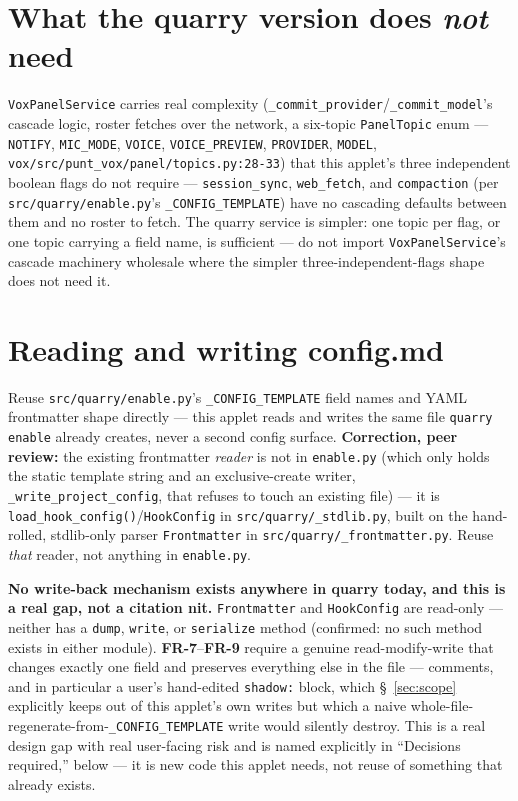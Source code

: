 \documentclass[a4paper,11pt]{report}
\newcommand{\fr}[1]{\textbf{FR-#1}}
\begin{document}
\section{What the quarry version does \emph{not} need}

\texttt{VoxPanelService} carries real complexity
(\texttt{\_commit\_provider}/\texttt{\_commit\_model}'s cascade logic,
roster fetches over the network, a six-topic
\texttt{PanelTopic} enum --- \texttt{NOTIFY}, \texttt{MIC\_MODE},
\texttt{VOICE}, \texttt{VOICE\_PREVIEW}, \texttt{PROVIDER},
\texttt{MODEL}, \texttt{vox/src/punt\_vox/panel/topics.py:28-33}) that
this applet's three independent boolean
flags do not require --- \texttt{session\_sync}, \texttt{web\_fetch}, and
\texttt{compaction} (per \texttt{src/quarry/enable.py}'s
\texttt{\_CONFIG\_TEMPLATE}) have no cascading defaults between them and
no roster to fetch. The quarry service is simpler: one topic per flag,
or one topic carrying a field name, is sufficient --- do not import
\texttt{VoxPanelService}'s cascade machinery wholesale where the simpler
three-independent-flags shape does not need it.

\section{Reading and writing config.md}

Reuse \texttt{src/quarry/enable.py}'s \texttt{\_CONFIG\_TEMPLATE} field
names and YAML frontmatter shape directly --- this applet reads and
writes the same file \texttt{quarry enable} already creates, never a
second config surface. \textbf{Correction, peer review:} the existing
frontmatter \emph{reader} is not in \texttt{enable.py} (which only holds
the static template string and an exclusive-create writer,
\texttt{\_write\_project\_config}, that refuses to touch an existing
file) --- it is \texttt{load\_hook\_config()}/\texttt{HookConfig} in
\texttt{src/quarry/\_stdlib.py}, built on the hand-rolled, stdlib-only
parser \texttt{Frontmatter} in \texttt{src/quarry/\_frontmatter.py}.
Reuse \emph{that} reader, not anything in \texttt{enable.py}.

\textbf{No write-back mechanism exists anywhere in quarry today, and
this is a real gap, not a citation nit.} \texttt{Frontmatter} and
\texttt{HookConfig} are read-only --- neither has a \texttt{dump},
\texttt{write}, or \texttt{serialize} method (confirmed: no such method
exists in either module). \fr{7}--\fr{9} require a genuine
read-modify-write that changes exactly one field and preserves
everything else in the file --- comments, and in particular a user's
hand-edited \texttt{shadow:} block, which \S~\ref{sec:scope} explicitly
keeps out of this applet's own writes but which a naive
whole-file-regenerate-from-\texttt{\_CONFIG\_TEMPLATE} write would
silently destroy. This is a real design gap with real user-facing risk
and is named explicitly in ``Decisions required,'' below --- it is new
code this applet needs, not reuse of something that already exists.
\end{document}
